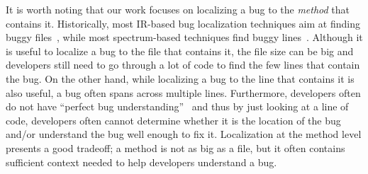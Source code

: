 It is worth noting that our work focuses on localizing a bug to the \emph{method} that contains it. Historically, most IR-based bug localization techniques aim at finding buggy files~\cite{Rao:2011:RSL:1985441.1985451,Sisman:2012:IVH:2664446.2664454,Zhou:2012:BFM:2337223.2337226,SahaLKP13}, while most spectrum-based techniques find buggy lines~\cite{JH05,Abreu:2009,RR03}. Although it is useful to localize a bug to the file that contains it, the file size can be big and developers still need to go through a lot of code to find the few lines that contain the bug. On the other hand, while localizing a bug to the line that contains it is also useful, a bug often spans across multiple lines. Furthermore, developers often do not have ``perfect bug understanding''~\cite{ParninO11} and thus by just looking at a line of code, developers often cannot determine whether it is the location of the bug and/or understand the bug well enough to fix it. Localization at the method level presents a good tradeoff; a method is not as big as a file, but it often contains sufficient context needed to help developers understand a bug.





